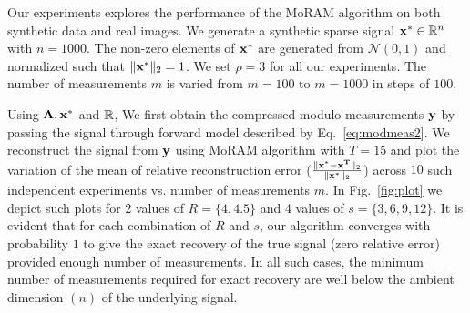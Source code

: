 Our experiments explores the performance of the MoRAM algorithm on both synthetic data and real images. We generate a synthetic sparse signal $\mathbf{x^*} \in {\mathbb{R}}^n$ with $n=1000$. The non-zero elements of $\mathbf{x^*}$ are generated from $\mathcal{N}(0,1)$ and normalized such that $\|\mathbf{x^*}\|_2 =1$. We set $\rho=3$ for all our experiments. The number of measurements $m$ is varied from $m = 100$ to $m=1000$ in steps of $100$. 


Using $\mathbf{A, x^*}$ and ${\mathbb{R}}$, We first obtain the compressed modulo measurements $\mathbf{y}$ by passing the signal through forward model described by Eq.~\ref{eq:modmeas2}. We reconstruct the signal from $\mathbf{y}$ using MoRAM algorithm with $T=15$ and plot the variation of the mean of relative reconstruction error ($\frac{\|\mathbf{x^*-x^T}\|_2}{\|\mathbf{x^*}\|_2}$) across $10$ such independent experiments vs. number of measurements $m$. In Fig.~\ref{fig:plot} we depict such plots for $2$ values of $R=\{4,4.5\}$ and $4$ values of $s=\{3,6,9,12\}$. It is evident that for each combination of $R$ and $s$, our algorithm converges with probability $1$ to give the exact recovery of the true signal (zero relative error) provided enough number of measurements. In all such cases, the minimum number of measurements required for exact recovery are well below the ambient dimension $(n)$ of the underlying signal. 


